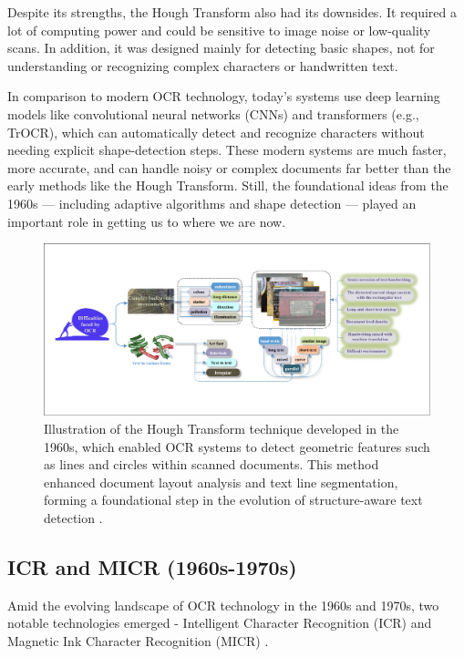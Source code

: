 Despite its strengths, the Hough Transform also had its downsides. It required a lot of 
computing power and could be sensitive to image noise or low-quality scans. In addition, 
it was designed mainly for detecting basic shapes, not for understanding or recognizing 
complex characters or handwritten text.

In comparison to modern OCR technology, today’s systems use deep learning models like 
convolutional neural networks (CNNs) and transformers (e.g., TrOCR), which can automatically 
detect and recognize characters without needing explicit shape-detection steps. These modern 
systems are much faster, more accurate, and can handle noisy or complex documents far better 
than the early methods like the Hough Transform. Still, the foundational ideas from the 
1960s — including adaptive algorithms and shape detection — played an important role in 
getting us to where we are now. 

\begin{figure}[ht]
    \centering
    \includegraphics[width=1\textwidth]{figures/Hough_Transform_technique.png}
    \caption{Illustration of the Hough Transform technique developed in the 1960s, 
    which enabled OCR systems to detect geometric features such as lines and circles 
    within scanned documents. This method enhanced document layout analysis and text 
    line segmentation, forming a foundational step in the evolution of 
    structure-aware text detection \cite{liu2023hough}.}
    \label{fig:hough-transform}
\end{figure}

\subsection{ICR and MICR (1960s-1970s)}
\label{sec:icr-micr}

Amid the evolving landscape of OCR technology in the 1960s and 1970s, two notable 
technologies emerged - Intelligent Character Recognition (ICR) and Magnetic Ink Character 
Recognition (MICR) \cite{phyu2009hybrid}.

